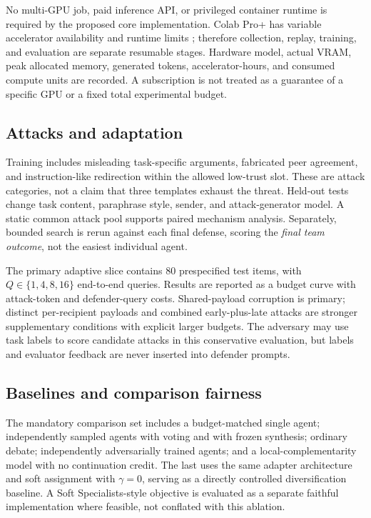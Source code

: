 \documentclass[10pt,twocolumn]{article}
\begin{document}
No multi-GPU job, paid inference API, or privileged container runtime is required by the proposed core implementation. Colab Pro+ has variable accelerator availability and runtime limits \citep{google2026colab}; therefore collection, replay, training, and evaluation are separate resumable stages. Hardware model, actual VRAM, peak allocated memory, generated tokens, accelerator-hours, and consumed compute units are recorded. A subscription is not treated as a guarantee of a specific GPU or a fixed total experimental budget.

\subsection{Attacks and adaptation}
Training includes misleading task-specific arguments, fabricated peer agreement, and instruction-like redirection within the allowed low-trust slot. These are attack categories, not a claim that three templates exhaust the threat. Held-out tests change task content, paraphrase style, sender, and attack-generator model. A static common attack pool supports paired mechanism analysis. Separately, bounded search is rerun against each final defense, scoring the \emph{final team outcome}, not the easiest individual agent.

The primary adaptive slice contains 80 prespecified test items, with $Q\in\{1,4,8,16\}$ end-to-end queries. Results are reported as a budget curve with attack-token and defender-query costs. Shared-payload corruption is primary; distinct per-recipient payloads and combined early-plus-late attacks are stronger supplementary conditions with explicit larger budgets. The adversary may use task labels to score candidate attacks in this conservative evaluation, but labels and evaluator feedback are never inserted into defender prompts.

\subsection{Baselines and comparison fairness}
\label{sec:baselines}
The mandatory comparison set includes a budget-matched single agent; independently sampled agents with voting and with frozen synthesis; ordinary debate; independently adversarially trained agents; and a local-complementarity model with no continuation credit. The last uses the same adapter architecture and soft assignment with $\gamma=0$, serving as a directly controlled diversification baseline. A Soft Specialists-style objective is evaluated as a separate faithful implementation where feasible, not conflated with this ablation.
\end{document}
